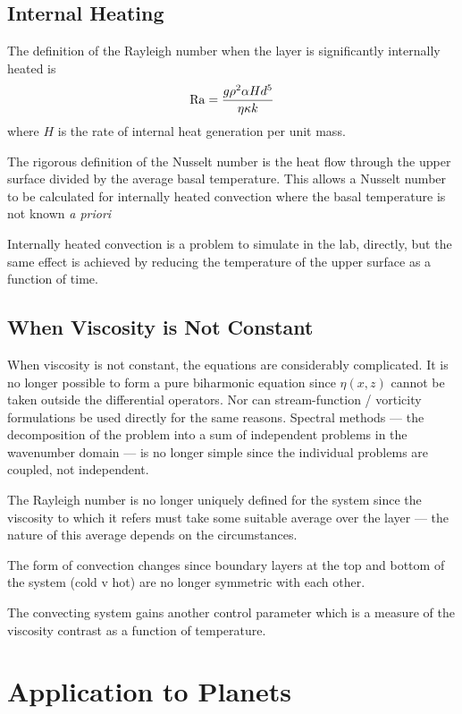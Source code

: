 \documentclass[10pt]{article}
\begin{document}
	\subsection{Internal Heating}	
	
	The definition of the Rayleigh number when the layer is significantly
	internally heated is
		\begin{equation}
			{\rm Ra} = \frac{g \rho^2 \alpha H d^5}{\eta \kappa k}
		\end{equation}
	where $H$ is the rate of internal heat generation per unit mass.
	
	The rigorous definition of the Nusselt number is the heat flow 
	through the upper surface divided by the average basal temperature. This
	allows a Nusselt number to be calculated for internally heated convection
	where the basal temperature is not known {\em a priori}
	
	Internally heated convection is a problem to simulate in the lab, directly, but
	the same effect is achieved by reducing the temperature of the upper surface as a function of
	time.
	
	\subsection{When Viscosity is Not Constant}
	
		When viscosity is not constant, the equations are considerably complicated.
		It is no longer possible to form a pure biharmonic equation since $\eta(x,z)$ cannot
		be taken outside the differential operators. Nor can stream-function / vorticity formulations
		be used directly for the same reasons. Spectral methods — the decomposition 
		of the problem into a sum of independent problems in the wavenumber domain —
		is no longer simple since the individual problems are coupled, not independent.
		
		The Rayleigh number is no longer uniquely defined for the system since
		the viscosity to which it refers must take some suitable average over the 
		layer — the nature of this average depends on the circumstances.
		
		The form of convection changes since boundary layers at the top and
		bottom of the system (cold v hot) are no longer symmetric with each other.
		
		The convecting system gains another control parameter which is a measure of the
		viscosity contrast as a function of temperature.
	
\section{Application to Planets}
	
\end{document}

